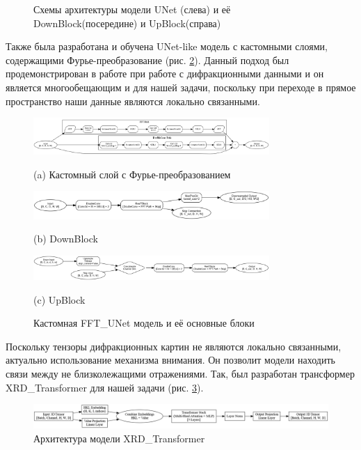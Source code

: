 \documentclass[a4paper,12pt]{article}
\begin{document}
{\begin{figure}[H]
    \caption{Схемы архитектуры модели UNet (слева) и её DownBlock(посередине) и UpBlock(справа)}
    \label{unet}
\end{figure}

Также была разработана и обучена UNet-like модель с кастомными слоями, содержащими Фурье-преобразование (рис. \ref{fft_unet}). Данный подход был продемонстрирован в работе \cite{fft} при работе с дифракционными данными и он является многообещающим и для нашей задачи, поскольку при переходе в прямое пространство наши данные являются локально связанными.


\begin{figure}[H]
    \centering
    \includegraphics[width=0.8\textwidth]{resf_block_architecture.png}
    \caption*{(a) Кастомный слой с Фурье-преобразованием}
    
    \vspace{1em}
    \includegraphics[width=0.8\textwidth]{fft_down_block_architecture.png}
    \caption*{(b) DownBlock}
    
    \vspace{1em}
    \includegraphics[width=0.8\textwidth]{fft_up_block_architecture.png}
    \caption*{(c) UpBlock}
    
    \caption{Кастомная FFT\_UNet модель и её основные блоки}
    \label{fft_unet}
\end{figure}

Поскольку тензоры дифракционных картин не являются локально связанными, актуально использование механизма внимания. Он позволит модели находить связи между не близколежащими отражениями. Так, был разработан трансформер XRD\_Transformer для нашей задачи (рис. \ref{XRDTrans}). 

\begin{figure}[H]
    \centering
    \includegraphics[width=1\textwidth]{transformer.png}
    \caption{Архитектура модели XRD\_Transformer}
    \label{XRDTrans}
\end{figure}

}
\end{document}
